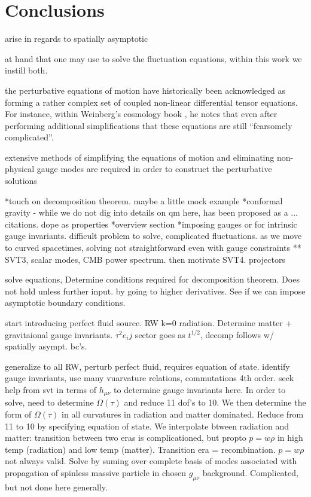 \chapter{Conclusions}
\label{C7}




arise in regards to spatially asymptotic


at hand that one may use to solve the fluctuation equations, within this work we instill both. 

the perturbative equations of motion have historically been acknowledged as forming a rather complex set of coupled non-linear differential tensor equations. For instance, within Weinberg's cosmology book \cite{weinberg_2008}, he notes that even after performing additional simplifications that these equations are still ``fearsomely complicated''. 






extensive methods of simplifying the equations of motion and eliminating non-physical gauge modes are required in order to construct the perturbative solutions


*touch on decomposition theorem. maybe a little mock example
*conformal gravity - while we do not dig into details on qm here, has been proposed as a ... citations. dope as properties
*overview section
*imposing gauges or for intrinsic gauge invariants. difficult problem to solve, complicated fluctuations. as we move to curved spacetimes, solving not straightforward even with gauge constraints
** SVT3, scalar modes, CMB power spectrum. then motivate SVT4. projectors


solve equations, Determine conditions required for decomposition theorem. Does not hold unless further input. by going to higher derivatives. See if we can impose asymptotic boundary conditions. 

start introducing perfect fluid source. RW k=0 radiation. Determine matter + gravitaional gauge invariants. $\tau^2 e_ij$ sector goes as $t^{1/2}$, decomp follows w/ spatially asympt. bc's.

generalize to all RW, perturb perfect fluid, requires equation of state. identify gauge invariants, use many vuarvature relations, commutations 4th order. seek help from svt in terms of $h_{\mu\nu}$ to determine gauge invariants here. In order to solve, need to determine $\Omega(\tau)$ and reduce 11 dof's to 10. We then determine the form of $\Omega(\tau)$ in all curvatures in radiation and matter dominated. Reduce from 11 to 10 by specifying equation of state. We interpolate btween radiation and matter: transition between two eras is complicationed, but propto $p=w\rho$ in high temp (radiation) and low temp (matter). Transition era = recombination. $p=w\rho$ not always valid. Solve by suming over complete basis of modes associated with propagation of spinless massive particle in chosen $g_{\mu\nu}$ background. Complicated, but not done here generally. 

